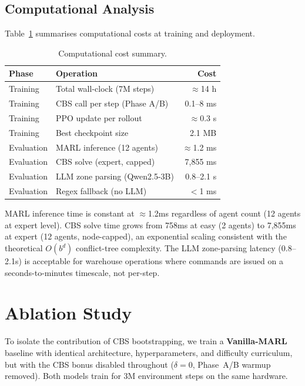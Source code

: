 \documentclass[letterpaper,twocolumn,10pt]{article}
\begin{document}
\subsection{Computational Analysis}

Table~\ref{tab:compute} summarises computational costs at training and deployment.

\begin{table}[t]
\centering
\caption{Computational cost summary.}
\label{tab:compute}
\small
\begin{tabular}{llr}
\toprule
Phase & Operation & Cost \\
\midrule
Training & Total wall-clock (7M steps) & $\approx$14 h \\
Training & CBS call per step (Phase A/B) & 0.1--8 ms \\
Training & PPO update per rollout & $\approx$0.3 s \\
Training & Best checkpoint size & 2.1 MB \\
\midrule
Evaluation & MARL inference (12 agents) & $\approx$1.2 ms \\
Evaluation & CBS solve (expert, capped) & 7,855 ms \\
Evaluation & LLM zone parsing (Qwen2.5-3B) & 0.8--2.1 s \\
Evaluation & Regex fallback (no LLM) & $<$1 ms \\
\bottomrule
\end{tabular}
\end{table}

MARL inference time is constant at $\approx$1.2ms regardless of agent count (12 agents
at expert level). CBS solve time grows from 758ms at easy (2 agents) to 7,855ms at
expert (12 agents, node-capped), an exponential scaling consistent with the theoretical
$O(b^d)$ conflict-tree complexity. The LLM zone-parsing latency (0.8--2.1s) is
acceptable for warehouse operations where commands are issued on a seconds-to-minutes
timescale, not per-step.

\section{Ablation Study}
\label{sec:ablation}

To isolate the contribution of CBS bootstrapping, we train a \textbf{Vanilla-MARL}
baseline with identical architecture, hyperparameters, and difficulty curriculum, but
with the CBS bonus disabled throughout ($\delta=0$, Phase~A/B warmup removed). Both
models train for 3M environment steps on the same hardware.
\end{document}
